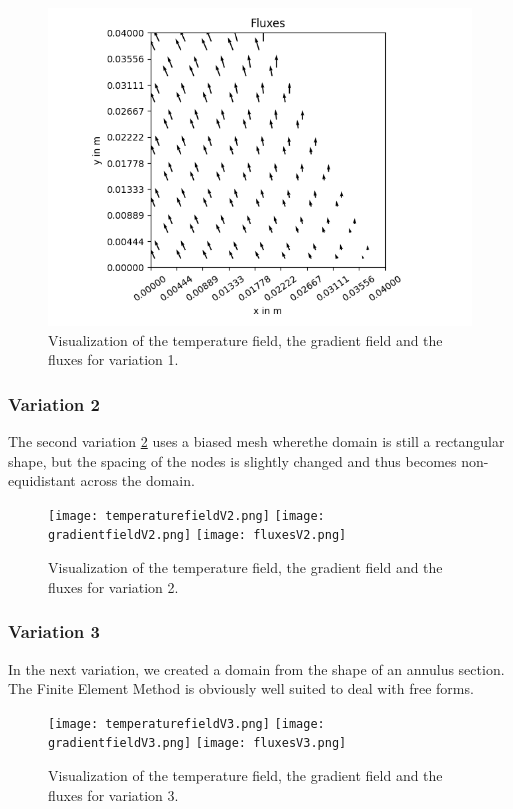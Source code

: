 \documentclass[a4paper,pt]{report}
\begin{document}
\begin{figure}
	\includegraphics[scale=0.3]{fluxesV1.png}
	\caption{Visualization of the temperature field, the gradient field and the fluxes for variation 1.}
	\label{plotsV1}
\end{figure}

\subsubsection*{Variation 2}
The second variation \ref{plotsV2} uses a biased mesh wherethe domain is still a rectangular shape, but the spacing of the nodes is slightly changed and thus becomes non-equidistant across the domain.

\begin{figure}
	\centering
	\texttt{[image: temperaturefieldV2.png]}
	\texttt{[image: gradientfieldV2.png]}
	\texttt{[image: fluxesV2.png]}
	\caption{Visualization of the temperature field, the gradient field and the fluxes for variation 2.}
	\label{plotsV2}
\end{figure}


\subsubsection*{Variation 3}
In the next variation, we created a domain from the shape of an annulus section. The Finite Element Method is obviously well suited to deal with free forms.

\begin{figure}
	\centering
	\texttt{[image: temperaturefieldV3.png]}
	\texttt{[image: gradientfieldV3.png]}
	\texttt{[image: fluxesV3.png]}
	\caption{Visualization of the temperature field, the gradient field and the fluxes for variation 3.}
	\label{plotsV3}
\end{figure}
\end{document}
